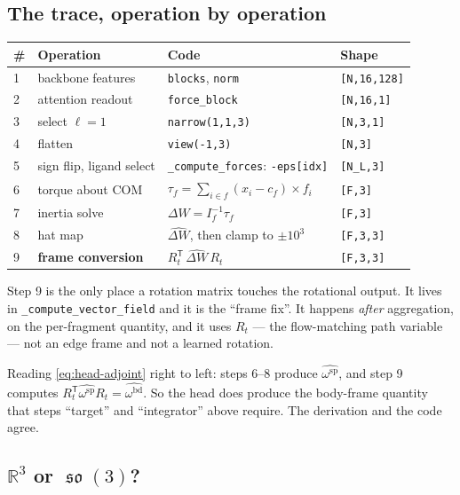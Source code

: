 \documentclass[11pt,a4paper]{report}
\theoremstyle{definition}
\theoremstyle{remark}
\DeclareMathOperator{\so}{\mathfrak{so}}
\newcommand{\RR}{\mathbb R}
\newcommand{\pyfunc}[1]{\texttt{#1}}
\newcommand{\shape}[1]{\texttt{[#1]}}
\begin{document}
\subsection{The trace, operation by operation}

\begin{center}
\begin{tabular}{llll}
\toprule
\# & Operation & Code & Shape \\
\midrule
1 & backbone features & \pyfunc{blocks}, \pyfunc{norm} & \shape{N,16,128} \\
2 & attention readout & \pyfunc{force\_block} & \shape{N,16,1} \\
3 & select $\ell=1$ & \texttt{narrow(1,1,3)} & \shape{N,3,1} \\
4 & flatten & \texttt{view(-1,3)} & \shape{N,3} \\
5 & sign flip, ligand select & \pyfunc{\_compute\_forces}: \texttt{-eps[idx]} & \shape{N\_L,3} \\
6 & torque about COM & $\tau_f=\sum_{i\in f}(x_i-c_f)\times f_i$ & \shape{F,3} \\
7 & inertia solve & $\Delta W=I_f^{-1}\tau_f$ & \shape{F,3} \\
8 & hat map & $\widehat{\Delta W}$, then clamp to $\pm10^3$ & \shape{F,3,3} \\
9 & \textbf{frame conversion} & $R_t^{\mathsf T}\,\widehat{\Delta W}\,R_t$ & \shape{F,3,3} \\
\bottomrule
\end{tabular}
\end{center}

Step 9 is the only place a rotation matrix touches the rotational output. It
lives in \pyfunc{\_compute\_vector\_field} and it is the ``frame fix''. It
happens \emph{after} aggregation, on the per-fragment quantity, and it uses
$R_t$ --- the flow-matching path variable --- not an edge frame and not a
learned rotation.

Reading \eqref{eq:head-adjoint} right to left: steps 6--8 produce
$\widehat{\omega^{\mathrm{sp}}}$, and step 9 computes
$R_t^{\mathsf T}\widehat{\omega^{\mathrm{sp}}}R_t=\widehat{\omega^{\mathrm{bd}}}$.
So the head does produce the body-frame quantity that steps ``target'' and
``integrator'' above require. The derivation and the code agree.

\subsection{$\RR^3$ or $\so(3)$?}
\end{document}
